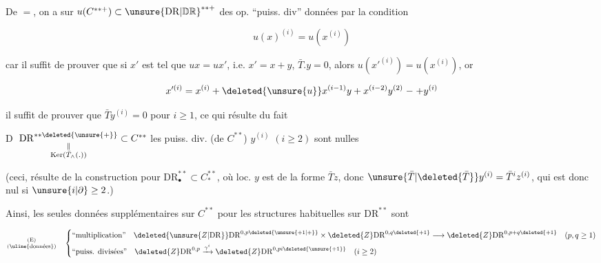 
De $=$, on a sur $u(C^{**+})\subset\unsure{\mathrm{DR}|\mathbb D\mathbb R}^{**+}$ des op. ``puiss. div''  données par la condition

\[
u(x)^{(i)}=u(x^{(i)})
\]

car il suffit de prouver que si $x'$ est tel que $ux=ux'$, i.e. $x'=x+y$, $\bar T.y=0$, alors $u(x'^{(i)})=u(x^{(i)})$,  or

\[
x'^{(i)}=x^{(i)}+\deleted{\unsure{u}}x^{(i-1)}y+x^{(i-2)}y^{(2)}\mathrel{\relbar}+y^{(i)}
\]

il suffit de prouver que $\bar T y^{(i)}=0$ pour $i\geq1$, ce qui résulte du fait  

\textcircled{D}\quad {} $\underset{\substack{\Vert\\\operatorname{Ker}(\bar T_\wedge(.))}}{\mathrm{DR}^{**\deleted{\unsure{+}}}}\subset C^{**}$  les puiss. div. (de $C^{**}$) $y^{(i)}$ $(i\geq2)$ sont nulles


(ceci,  résulte de la construction pour $\mathrm{DR}^{**}_\bullet\subset C^{**}_*$, où loc. $y$ est de la forme $\bar Tz$, donc $\unsure{\bar T|\deleted{\bar T}}y^{(i)}=\bar T^i z^{(i)}$, qui est donc nul si $\unsure{i|\partial}\geq2$.)


Ainsi, les seules données supplémentaires sur $C^{**}$ pour  les structures habituelles sur $\mathrm{DR}^{**}$ sont

\[
\substack{\text{(E)}\\\text{(\uline{données})}}\quad
\left\{\begin{aligned}
&\text{``multiplication''}\quad \deleted{\unsure{Z|\mathrm{DR}}}\mathrm{DR}^{0,p\deleted{\unsure{+1|+}}}
 \times\deleted{Z}\mathrm{DR}^{0,q\deleted{+1}}\longrightarrow\deleted{Z}\mathrm{DR}^{0,p+q\deleted{+1}}\quad(p,q\geq1)\\
&\text{``puiss. divisées''}\quad \deleted{Z}\mathrm{DR}^{0,p}\xrightarrow{\gamma^i}\deleted{Z}\mathrm{DR}^{0,pi\deleted{\unsure{+1}}}\quad(i\geq2)
\end{aligned}\right.
\]

